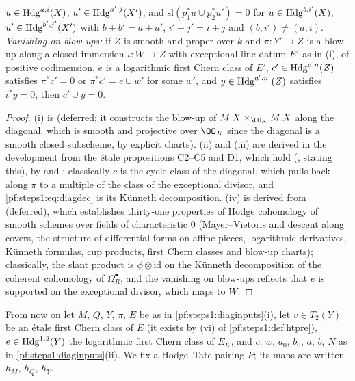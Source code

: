 \begin{lemma}
\begin{enumerate}[label=\textup{(\roman*)},nosep]
  $u\in\mathrm{Hdg}^{a,i}(X)$, $u'\in\mathrm{Hdg}^{a',j}(X')$, and $\mathrm{sl}(p_1^*u\cup p_2^*u')=0$ for $u\in\mathrm{Hdg}^{b,i'}(X)$,
  $u'\in\mathrm{Hdg}^{b',j'}(X')$ with $b+b'=a+a'$, $i'+j'=i+j$ and $(b,i')\ne(a,i)$. \emph{Vanishing on blow-ups:} if $Z$ is smooth
  and proper over $k$ and $\pi\colon Y'\to Z$ is a blow-up along a closed immersion $\iota\colon W\to Z$ with exceptional line
  datum $E'$ as in \textup{(i)}, of positive codimension, $e$ is a logarithmic first Chern class of $E'$, $c'\in
  \mathrm{Hdg}^{a,n}(Z)$ satisfies $\pi^*c'=0$ or $\pi^*c'=e\cup w'$ for some $w'$, and $y\in\mathrm{Hdg}^{a',n'}(Z)$ satisfies
  $\iota^*y=0$, then $c'\cup y=0$.
\end{enumerate}
\end{lemma}

\begin{proof}
(i) is  (deferred; it constructs the blow-up of $M.X\times_{\OO_K}M.X$ along
the diagonal, which is smooth and projective over $\OO_K$ since the diagonal is a smooth closed subscheme, by explicit
charts). (ii) and (iii) are derived in the development from the \'etale propositions C2--C5 and D1, which hold
(, stating this), by
 and ;
classically $c$ is the cycle class of the diagonal, which pulls back along $\pi$ to a multiple of the class of the exceptional
divisor, and \eqref{pf:steps1:eq:diagdec} is its K\"unneth decomposition. (iv) is derived from
 (deferred), which establishes thirty-one properties of Hodge cohomology
of smooth schemes over fields of characteristic $0$ (Mayer--Vietoris and descent along covers, the structure of differential
forms on affine pieces, logarithmic derivatives, K\"unneth formulas, cup products, first Chern classes and blow-up charts);
classically, the slant product is $\phi\otimes\mathrm{id}$ on the K\"unneth decomposition of the coherent cohomology of
$\Omega^\bullet_R$, and the vanishing on blow-ups reflects that $e$ is supported on the exceptional divisor, which maps to $W$.
\end{proof}

From now on let $M$, $Q$, $Y$, $\pi$, $E$ be as in \cref{pf:steps1:diaginputs}(i), let $v\in T_2(Y)$ be an \'etale first Chern
class of $E$ (it exists by (vi) of \cref{pf:steps1:def:htpre}), $e\in\mathrm{Hdg}^{1,2}(Y)$ the logarithmic first Chern class of
$E_K$, and $c$, $w$, $a_0$, $b_0$, $a$, $b$, $N$ as in \cref{pf:steps1:diaginputs}(ii). We fix a Hodge--Tate pairing
$P$; its maps are written $h_M$, $h_Q$, $h_Y$.

